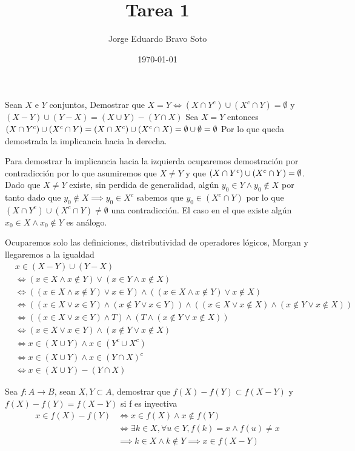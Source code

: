 \documentclass{homework}
\author{Jorge Eduardo Bravo Soto}
\date{\today}
\title{Tarea 1}
\begin{document}
\maketitle

\question Sean \(X\) e \(Y\) conjuntos, Demostrar que \(X = Y \iff (X \cap Y^{c}) \cup (X^{c} \cap Y) = \emptyset\) y \((X - Y) \cup (Y - X) = (X \cup Y) - (Y \cap X)\)
\label{sec:org1ee97d9}
\parte
Sea \(X = Y\) entonces
\((X \cap Y^{c}) \cup (X^{c} \cap Y) = (X \cap X^{c}) \cup (X^{c} \cap X) = \emptyset \cup \emptyset = \emptyset\)
Por lo que queda demostrada la implicancia hacia la derecha.

Para demostrar la implicancia hacia la izquierda ocuparemos demostración por contradicción por lo que asumiremos que
\(X \neq Y\) y que \((X \cap Y^{c}) \cup (X^{c} \cap Y) = \emptyset\). Dado que \(X \neq Y\) existe, sin perdida
de generalidad, algún \(y_0 \in Y \land y_0 \notin X\) por tanto dado que \(y_0 \notin X \implies y_0 \in X^{c}\)
sabemos que \(y_0 \in (X^{c} \cap Y)\) por lo que \((X \cap Y^{c}) \cup (X^{c} \cap Y) \neq \emptyset\)
una contradicción. El caso en el que existe algún \(x_0 \in X \land x_0 \notin Y\) es análogo.

\parte
Ocuparemos solo las definiciones, distributividad de operadores lógicos, Morgan y llegaremos a la igualdad
\begin{align*}
&x \in (X - Y) \cup (Y - X)\\
&\iff  (x \in X \land x \notin Y) \lor (x \in Y \land x \notin X)\\
&\iff ((x \in X \land x \notin Y) \lor x \in Y) \land ((x \in X \land x \notin Y) \lor x \notin X)\\
&\iff ((x \in X \lor x \in Y) \land (x \notin Y \lor x \in Y)) \land ((x \in X \lor x \notin X) \land (x \notin Y \lor x \notin X))\\
&\iff ((x \in X \lor x \in Y) \land T) \land (T \land (x \notin Y \lor x \notin X))\\
&\iff (x \in X \lor x \in Y) \land (x \notin Y \lor x \notin X)\\
&\iff x \in (X \cup Y) \land x \in (Y^{c} \cup X^{c})\\
&\iff x \in (X \cup Y) \land x \in (Y \cap X)^{c}\\
&\iff x \in (X \cup Y) - (Y \cap X)
\end{align*}

\question Sea \(f : A \to B\), sean \(X, Y \subset A\), demostrar que \(f(X) - f(Y) \subset f(X - Y)\) y \(f(X) - f(Y) = f(X - Y)\) si f es inyectiva
\label{sec:org366fa32}
\parte
\begin{align*}
    x \in f(X) - f(Y) &\iff x \in f(X) \land x \notin f(Y)\\
&\iff \exists k \in X, \forall u \in Y, f(k) = x \land  f(u) \neq x\\
&\implies k \in X \land k \notin Y \implies x \in f(X - Y)
\end{align*}
\end{document}
